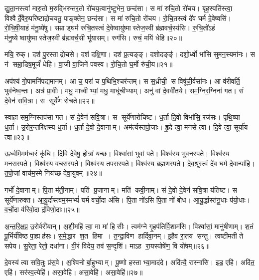 द्यु॒ता॒नस्त्वा॑ मारु॒तो म॒रुद्भि॑रुत्तर॒तो रो॑चय॒त्वानु॑ष्टुभेन॒ छन्द॑सा। 
स मा॑ रुचि॒तो रो॑चय। 
बृह॒स्पति॑स्त्वा॒ विश्वैर्दे॒वैरु॒परि॑ष्टाद्रोचयतु॒ पाङ्क्ते॑न॒ छन्द॑सा। 
स मा॑ रुचि॒तो रो॑चय। 
रो॒चि॒तस्त्वं दे॑व घर्म दे॒वेष्वसि॑। 
रो॒चि॒षी॒याहं म॑नु॒ष्ये॑षु। 
सम्राड्घर्म रुचि॒तस्त्वं दे॒वेष्वायु॑ष्मास्तेज॒स्वी ब्र॑ह्मवर्च॒स्य॑सि। 
रु॒चि॒तो॑ऽहं म॑नु॒ष्येष्वायु॑ष्मास्तेज॒स्वी ब्र॑ह्मवर्च॒सी भू॑यासम्। 
रुग॑सि। 
रुचं॒ मयि॑ धेहि॥२०॥

मयि॒ रुक्। 
दश॑ पु॒रस्ताद्रोचसे। 
दश॑ दक्षि॒णा। 
दश॑ प्र॒त्यङ्ङ्। 
दशोदङ्ङ्॑। 
दशो॒र्ध्वो भा॑सि सुमन॒स्यमा॑नः। 
स न॑ सम्रा॒डिष॒मूर्जं॑ धेहि। 
वा॒जी वा॒जिने॑ पवस्व। 
रो॒चि॒तो घ॒र्मो रु॑ची॒य॥२१॥
\anuvakamend[रो॒च॒य॒ धे॒हि॒ नव॑ च]

अप॑श्यं गो॒पामनि॑पद्यमानम्। 
आ च॒ परा॑ च प॒थिभि॒श्चर॑न्तम्। 
स स॒ध्रीची॒ स विषू॑ची॒र्वसा॑नः। 
आ व॑रीवर्ति॒ भुव॑नेष्व॒न्तः। 
अत्र॑ प्रा॒वीः। 
मधु॒ माध्वीभ्यां॒ मधु॒ माधू॑चीभ्याम्। 
अनु॑ वां दे॒ववी॑तये। 
सम॒ग्निर॒ग्निना॑ गत। 
सं दे॒वेन॑ सवि॒त्रा। 
स सूर्ये॑ण रोचते॥२२॥

स्वाहा॒ सम॒ग्निस्तप॑सा गत। 
सं दे॒वेन॑ सवि॒त्रा। 
स सूर्ये॑णारोचिष्ट। 
ध॒र्ता दि॒वो विभा॑सि॒ रज॑सः। 
पृ॒थि॒व्या ध॒र्ता। 
उ॒रोर॒न्तरि॑क्षस्य ध॒र्ता। 
ध॒र्ता दे॒वो दे॒वानाम्। 
अम॑र्त्यस्तपो॒जाः। 
हृ॒दे त्वा॒ मन॑से त्वा। 
दि॒वे त्वा॒ सूर्या॑य त्वा॥२३॥

ऊ॒र्ध्वमि॒मम॑ध्व॒रं कृ॑धि। 
दि॒वि दे॒वेषु॒ होत्रा॑ यच्छ। 
विश्वा॑सां भुवां पते। 
विश्व॑स्य भुवनस्पते। 
विश्व॑स्य मनसस्पते। 
विश्व॑स्य वचसस्पते। 
विश्व॑स्य तपसस्पते। 
विश्व॑स्य ब्रह्मणस्पते। 
दे॒व॒श्रूस्त्वं दे॑व घर्म दे॒वान्पा॑हि। 
त॒पो॒जां वाच॑म॒स्मे निय॑च्छ देवा॒युवम्॥२४॥

गर्भो॑ दे॒वानाम्। 
पि॒ता म॑ती॒नाम्। 
पति॑ प्र॒जानाम्। 
मति॑ कवी॒नाम्। 
सं दे॒वो दे॒वेन॑ सवि॒त्रा य॑तिष्ट। 
स सूर्ये॑णारुक्त। 
आ॒यु॒र्दास्त्वम॒स्मभ्यं॑ घर्म वर्चो॒दा अ॑सि। 
पि॒ता नो॑ऽसि पि॒ता नो॑ बोध। 
आ॒यु॒र्द्धास्त॑नू॒धाः प॑यो॒धाः। 
व॒र्चो॒दा व॑रिवो॒दा द्र॑विणो॒दाः॥२५॥

अ॒न्त॒रि॒क्ष॒प्र॒ उ॒रोर्वरी॑यान्। 
अ॒शी॒महि॑ त्वा॒ मा मा॑ हिसीः। 
त्वम॑ग्ने गृ॒हप॑तिर्वि॒शाम॑सि। 
विश्वा॑सां॒ मानु॑षीणाम्। 
श॒तं पू॒र्भिर्य॑विष्ठ पा॒ह्यह॑सः। 
स॒मे॒द्धार श॒त हिमा। 
त॒न्द्रा॒विण हार्दिवा॒नम्। 
इ॒हैव रा॒तय॑ सन्तु। 
त्वष्टी॑मती ते सपेय। 
सु॒रेता॒ रेतो॒ दधा॑ना। 
वी॒रं  वि॑देय॒ तव॑ स॒न्दृशि॑। 
माऽह रा॒यस्पोषे॑ण॒ वि यो॑षम्॥२६॥
\anuvakamend[रो॒च॒ते॒ सूर्या॑य त्वा देवा॒युवं॑ द्रविणो॒दा दधा॑ना॒ द्वे च॑]


दे॒वस्य॑ त्वा सवि॒तुः प्र॑स॒वे। 
अ॒श्विनोर्बा॒हुभ्याम्। 
पू॒ष्णो हस्ताभ्या॒माद॑दे। 
अदि॑त्यै॒ रास्ना॑सि। 
इड॒ एहि॑। 
अदि॑त॒ एहि॑। 
सर॑स्व॒त्येहि॑। 
असा॒वेहि॑। 
असा॒वेहि॑। 
असा॒वेहि॑॥२७॥

